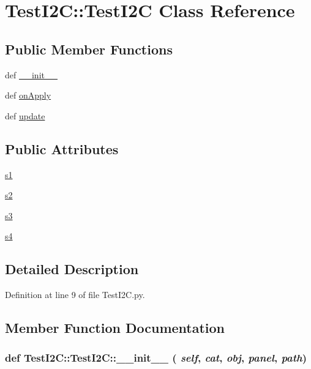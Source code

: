 \hypertarget{classTestI2C_1_1TestI2C}{
\section{TestI2C::TestI2C Class Reference}
\label{classTestI2C_1_1TestI2C}
}
\subsection*{Public Member Functions}
\begin{DoxyCompactItemize}
\item 
def \hyperlink{classTestI2C_1_1TestI2C_ab74f55b254d044b0ebfd47d04a765074}{\_\-\_\-init\_\-\_\-}
\item 
def \hyperlink{classTestI2C_1_1TestI2C_af291b7193981a5fedac63f6d4b237755}{onApply}
\item 
def \hyperlink{classTestI2C_1_1TestI2C_a65a49c0918b5ec6475fcea5fa405d5fb}{update}
\end{DoxyCompactItemize}
\subsection*{Public Attributes}
\begin{DoxyCompactItemize}
\item 
\hyperlink{classTestI2C_1_1TestI2C_a00d57a9891262d6929a7c788ef4a4d66}{s1}
\item 
\hyperlink{classTestI2C_1_1TestI2C_ab4812bf64775a479e0580e7f36b7bfef}{s2}
\item 
\hyperlink{classTestI2C_1_1TestI2C_a2d30fcf71b708351db5027bebcd70b6e}{s3}
\item 
\hyperlink{classTestI2C_1_1TestI2C_a30d6040b97028171387aa0b6edc158ef}{s4}
\end{DoxyCompactItemize}


\subsection{Detailed Description}


Definition at line 9 of file TestI2C.py.

\subsection{Member Function Documentation}
\hypertarget{classTestI2C_1_1TestI2C_ab74f55b254d044b0ebfd47d04a765074}{
\subsubsection[{\_\-\_\-init\_\-\_\-}]{\setlength{\rightskip}{0pt plus 5cm}def TestI2C::TestI2C::\_\-\_\-init\_\-\_\- ( {\em self}, \/   {\em cat}, \/   {\em obj}, \/   {\em panel}, \/   {\em path})}}
\label{classTestI2C_1_1TestI2C_ab74f55b254d044b0ebfd47d04a765074}


